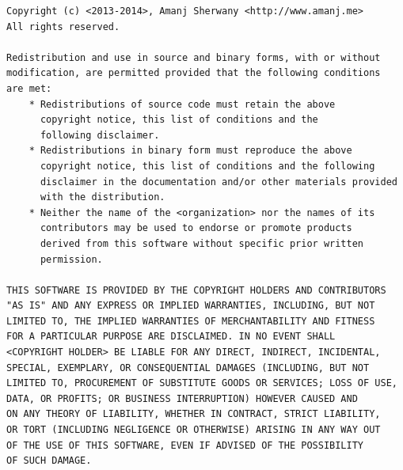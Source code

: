 \documentclass{article}
\begin{document}
\begin{verbatim}
Copyright (c) <2013-2014>, Amanj Sherwany <http://www.amanj.me> 
All rights reserved.

Redistribution and use in source and binary forms, with or without
modification, are permitted provided that the following conditions 
are met:
    * Redistributions of source code must retain the above 
      copyright notice, this list of conditions and the 
      following disclaimer.
    * Redistributions in binary form must reproduce the above 
      copyright notice, this list of conditions and the following 
      disclaimer in the documentation and/or other materials provided 
      with the distribution.
    * Neither the name of the <organization> nor the names of its 
      contributors may be used to endorse or promote products
      derived from this software without specific prior written 
      permission.

THIS SOFTWARE IS PROVIDED BY THE COPYRIGHT HOLDERS AND CONTRIBUTORS 
"AS IS" AND ANY EXPRESS OR IMPLIED WARRANTIES, INCLUDING, BUT NOT 
LIMITED TO, THE IMPLIED WARRANTIES OF MERCHANTABILITY AND FITNESS 
FOR A PARTICULAR PURPOSE ARE DISCLAIMED. IN NO EVENT SHALL 
<COPYRIGHT HOLDER> BE LIABLE FOR ANY DIRECT, INDIRECT, INCIDENTAL, 
SPECIAL, EXEMPLARY, OR CONSEQUENTIAL DAMAGES (INCLUDING, BUT NOT 
LIMITED TO, PROCUREMENT OF SUBSTITUTE GOODS OR SERVICES; LOSS OF USE, 
DATA, OR PROFITS; OR BUSINESS INTERRUPTION) HOWEVER CAUSED AND
ON ANY THEORY OF LIABILITY, WHETHER IN CONTRACT, STRICT LIABILITY, 
OR TORT (INCLUDING NEGLIGENCE OR OTHERWISE) ARISING IN ANY WAY OUT 
OF THE USE OF THIS SOFTWARE, EVEN IF ADVISED OF THE POSSIBILITY 
OF SUCH DAMAGE.

\end{verbatim}
\end{document}
